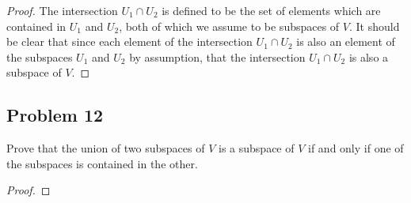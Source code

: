 \documentclass[letterpaper, 12pt]{amsart}
\theoremstyle{definition}  %
\begin{document}
		\begin{proof}
		The intersection $U_{1} \cap U_{2}$ is defined to be the set of elements which are contained in $U_{1}$ and $U_{2}$, both of which we assume to be subspaces of $V$.
		It should be clear that since each element of the intersection $U_{1} \cap U_{2}$ is also an element of the subspaces $U_{1}$ and $U_{2}$ by assumption, that the intersection $U_{1} \cap U_{2}$ is also a subspace of $V$.
		\end{proof}

		\subsection*{Problem 12}
		Prove that the union of two subspaces of $V$ is a subspace of $V$ if and only if one of the subspaces is contained in the other.

		\begin{proof}
		\end{proof}		
\end{document}
